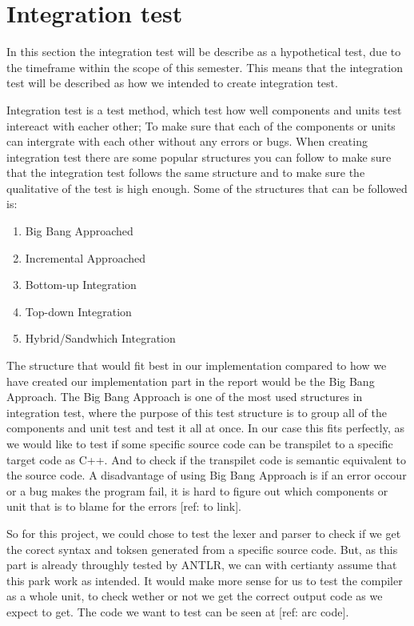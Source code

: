 \section{Integration test}\label{subsec:integrationtest}


In this section the integration test will be describe as a hypothetical test, due to the timeframe within the scope of this semester. This means that the integration test will be described as how we intended to create integration test.

Integration test is a test method, which test how well components and units test intereact with eacher other; To make sure that each of the components or units can intergrate with each other without any errors or bugs. When creating integration test there are some popular structures you can follow to make sure that the integration test follows the same structure and to make sure the qualitative of the test is high enough. Some of the structures that can be followed is:

\begin{enumerate}
    \item Big Bang Approached
    \item Incremental Approached
    \item Bottom-up Integration
    \item Top-down Integration
    \item Hybrid/Sandwhich Integration
\end{enumerate}

The structure that would fit best in our implementation compared to how we have created our implementation part in the report would be the Big Bang Approach. The Big Bang Approach is one of the most used structures in integration test, where the purpose of this test structure is to group all of the components and unit test and test it all at once. In our case this fits perfectly, as we would like to test if some specific source code can be transpilet to a specific target code as C++. And to check if the transpilet code is semantic equivalent to the source code. A disadvantage of using Big Bang Approach is if an error occour or a bug makes the program fail, it is hard to figure out which components or unit that is to blame for the errors [ref: to link].

So for this project, we could chose to test the lexer and parser to check if we get the corect syntax and toksen generated from a specific source code. But, as this part is already throughly tested by ANTLR, we can with certianty assume that this park work as intended. It would make more sense for us to test the compiler as a whole unit, to check wether or not we get the correct output code as we expect to get. The code we want to test can be seen at [ref: arc code].


